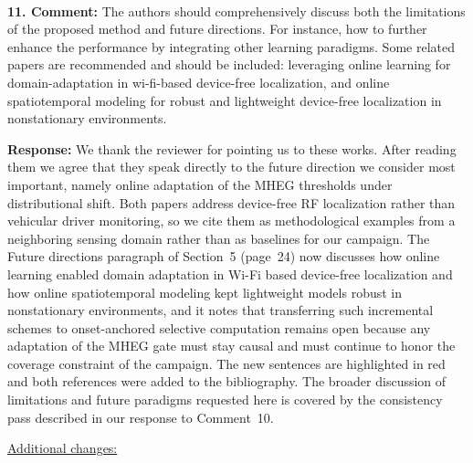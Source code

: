 \documentclass[1p,12pt,authoryear]{elsarticle}
\begin{document}
~

\noindent \textbf{11. Comment:} The authors should comprehensively discuss both the limitations of the proposed method and future directions. For instance, how to further enhance the performance by integrating other learning paradigms. Some related papers are recommended and should be included: leveraging online learning for domain-adaptation in wi-fi-based device-free localization, and online spatiotemporal modeling for robust and lightweight device-free localization in nonstationary environments.

\vspace{2mm}
\noindent \textbf{Response:} We thank the reviewer for pointing us to these works. After reading them we agree that they speak directly to the future direction we consider most important, namely online adaptation of the MHEG thresholds under distributional shift. Both papers address device-free RF localization rather than vehicular driver monitoring, so we cite them as methodological examples from a neighboring sensing domain rather than as baselines for our campaign. The Future directions paragraph of Section~5 (page~24) now discusses how online learning enabled domain adaptation in Wi-Fi based device-free localization and how online spatiotemporal modeling kept lightweight models robust in nonstationary environments, and it notes that transferring such incremental schemes to onset-anchored selective computation remains open because any adaptation of the MHEG gate must stay causal and must continue to honor the coverage constraint of the campaign. The new sentences are highlighted in red and both references were added to the bibliography. The broader discussion of limitations and future paradigms requested here is covered by the consistency pass described in our response to Comment~10.

\newpage


\begin{large}
\noindent \underline{Additional changes:}
\end{large}

\vspace{10pt}
\end{document}
